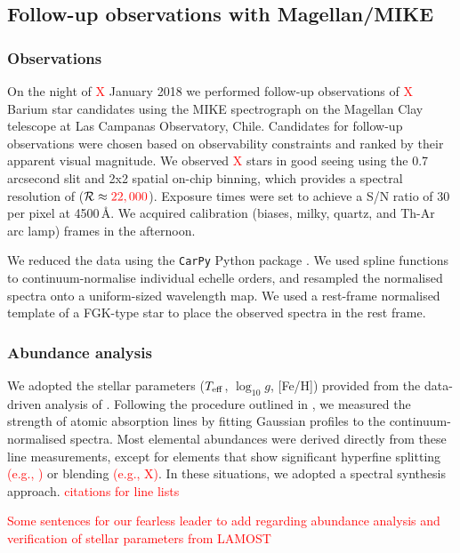\documentclass[a4paper,fleqn,usenatbib]{mnras}
\newcommand{\todo}[1]{\textcolor{red}{#1}}
\begin{document}
\subsection{Follow-up observations with Magellan/MIKE}

\subsubsection{Observations}
On the night of \todo{X} January 2018 we performed follow-up observations of \todo{X} Barium star candidates using the MIKE spectrograph on the Magellan Clay telescope at Las Campanas Observatory, Chile. Candidates for follow-up observations were chosen based on observability constraints and ranked by their apparent visual magnitude. We observed \todo{X} stars in good seeing using the 0.7 arcsecond slit and 2x2 spatial on-chip binning, which provides a spectral resolution of ($\mathcal{R} \approx \todo{22,000}$). Exposure times were set to achieve a S/N ratio of 30 per pixel at 4500\,\AA. We acquired calibration (biases, milky, quartz, and Th-Ar arc lamp) frames in the afternoon.

We reduced the data using the \texttt{CarPy} Python package \citep{kelson2000,kelson2003}. We used spline functions to continuum-normalise individual echelle orders, and resampled the normalised spectra onto a uniform-sized wavelength map. We used a rest-frame normalised template of a FGK-type star to place the observed spectra in the rest frame.


\subsubsection{Abundance analysis}
We adopted the stellar parameters ($T_{\rm eff}$, $\log_{10}g$, [Fe/H]) provided from the data-driven analysis of \citep{ho2017}. Following the procedure outlined in \citep{casey2014}, we measured the strength of atomic absorption lines by fitting Gaussian profiles to the continuum-normalised spectra. Most elemental abundances were derived directly from these line measurements, except for elements that show significant hyperfine splitting \todo{(e.g., )} or blending \todo{(e.g., X)}. In these situations, we adopted a spectral synthesis approach. \todo{citations for line lists}


\todo{Some sentences for our fearless leader to add regarding abundance analysis and verification of stellar parameters from LAMOST}

\end{document}
